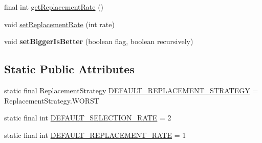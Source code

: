 \begin{DoxyCompactItemize}
\item 
final int \hyperlink{classjenes_1_1stage_1_1operator_1_1common_1_1_steady_state_3_01_t_01extends_01_chromosome_01_4_a32b13dd16c8bb611085477f02bc23cfc}{get\-Replacement\-Rate} ()
\item 
void \hyperlink{classjenes_1_1stage_1_1operator_1_1common_1_1_steady_state_3_01_t_01extends_01_chromosome_01_4_a8e504ea91d2e2c18fefa54042388e188}{set\-Replacement\-Rate} (int rate)
\item 
\hypertarget{classjenes_1_1stage_1_1operator_1_1common_1_1_steady_state_3_01_t_01extends_01_chromosome_01_4_a4aaac6d7b52c8d107b98ab9170a14715}{void {\bfseries set\-Bigger\-Is\-Better} (boolean flag, boolean recursively)}\label{classjenes_1_1stage_1_1operator_1_1common_1_1_steady_state_3_01_t_01extends_01_chromosome_01_4_a4aaac6d7b52c8d107b98ab9170a14715}

\end{DoxyCompactItemize}
\subsection*{Static Public Attributes}
\begin{DoxyCompactItemize}
\item 
static final Replacement\-Strategy \hyperlink{classjenes_1_1stage_1_1operator_1_1common_1_1_steady_state_3_01_t_01extends_01_chromosome_01_4_a4ed786deaaaefebd47fffc18e99b3710}{D\-E\-F\-A\-U\-L\-T\-\_\-\-R\-E\-P\-L\-A\-C\-E\-M\-E\-N\-T\-\_\-\-S\-T\-R\-A\-T\-E\-G\-Y} = Replacement\-Strategy.\-W\-O\-R\-S\-T
\item 
static final int \hyperlink{classjenes_1_1stage_1_1operator_1_1common_1_1_steady_state_3_01_t_01extends_01_chromosome_01_4_a9d6bcfbcf1911ce2936e782e96919ebd}{D\-E\-F\-A\-U\-L\-T\-\_\-\-S\-E\-L\-E\-C\-T\-I\-O\-N\-\_\-\-R\-A\-T\-E} = 2
\item 
static final int \hyperlink{classjenes_1_1stage_1_1operator_1_1common_1_1_steady_state_3_01_t_01extends_01_chromosome_01_4_a9700692d577e24267d1105f2a6e3d379}{D\-E\-F\-A\-U\-L\-T\-\_\-\-R\-E\-P\-L\-A\-C\-E\-M\-E\-N\-T\-\_\-\-R\-A\-T\-E} = 1
\end{DoxyCompactItemize}
